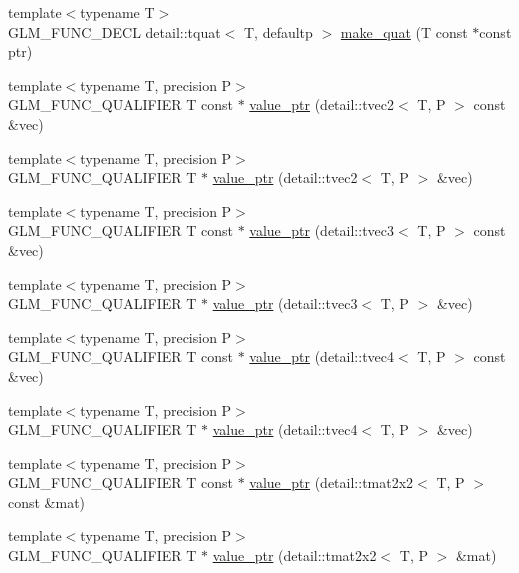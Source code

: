 \begin{CompactItemize}
\item 
{\footnotesize template$<$typename T$>$ }\\GLM\_\-FUNC\_\-DECL detail::tquat$<$ T, defaultp $>$ \hyperlink{group__gtc__type__ptr_gac5b8f1104856835d3d65d854362c85b}{make\_\-quat} (T const $\ast$const ptr)
\item 
{\footnotesize template$<$typename T, precision P$>$ }\\GLM\_\-FUNC\_\-QUALIFIER T const $\ast$ \hyperlink{group__gtc__type__ptr_gb43f07f8b8793c17c58c7b5826d4d5ff}{value\_\-ptr} (detail::tvec2$<$ T, P $>$ const \&vec)
\item 
{\footnotesize template$<$typename T, precision P$>$ }\\GLM\_\-FUNC\_\-QUALIFIER T $\ast$ \hyperlink{group__gtc__type__ptr_gfb7060ef2ca0edab610e0069ed911531}{value\_\-ptr} (detail::tvec2$<$ T, P $>$ \&vec)
\item 
{\footnotesize template$<$typename T, precision P$>$ }\\GLM\_\-FUNC\_\-QUALIFIER T const $\ast$ \hyperlink{group__gtc__type__ptr_g5668973c91b739c1a19f0ef201ddce50}{value\_\-ptr} (detail::tvec3$<$ T, P $>$ const \&vec)
\item 
{\footnotesize template$<$typename T, precision P$>$ }\\GLM\_\-FUNC\_\-QUALIFIER T $\ast$ \hyperlink{group__gtc__type__ptr_ga3e39c9c4cf1c1f573037fb2d6e6a1f9}{value\_\-ptr} (detail::tvec3$<$ T, P $>$ \&vec)
\item 
{\footnotesize template$<$typename T, precision P$>$ }\\GLM\_\-FUNC\_\-QUALIFIER T const $\ast$ \hyperlink{group__gtc__type__ptr_gc66d56efb1b37e96a17d235374f53a03}{value\_\-ptr} (detail::tvec4$<$ T, P $>$ const \&vec)
\item 
{\footnotesize template$<$typename T, precision P$>$ }\\GLM\_\-FUNC\_\-QUALIFIER T $\ast$ \hyperlink{group__gtc__type__ptr_g793e108db1bc068a8c09cf75c1b04389}{value\_\-ptr} (detail::tvec4$<$ T, P $>$ \&vec)
\item 
{\footnotesize template$<$typename T, precision P$>$ }\\GLM\_\-FUNC\_\-QUALIFIER T const $\ast$ \hyperlink{group__gtc__type__ptr_g97a60e78c46993259f0cbac724d0b354}{value\_\-ptr} (detail::tmat2x2$<$ T, P $>$ const \&mat)
\item 
{\footnotesize template$<$typename T, precision P$>$ }\\GLM\_\-FUNC\_\-QUALIFIER T $\ast$ \hyperlink{group__gtc__type__ptr_g2005106958abf8304187586557d11444}{value\_\-ptr} (detail::tmat2x2$<$ T, P $>$ \&mat)

\end{CompactItemize}
